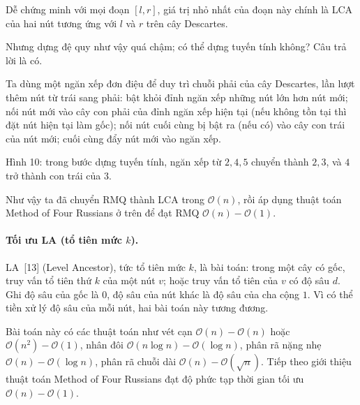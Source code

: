 \documentclass[11pt]{article}
\newcommand{\Oh}{\mathcal{O}}
\begin{document}
Dễ chứng minh với mọi đoạn \([l,r]\), giá trị nhỏ nhất của đoạn này chính là
LCA của hai nút tương ứng với \(l\) và \(r\) trên cây Descartes.

Nhưng dựng đệ quy như vậy quá chậm; có thể dựng tuyến tính không? Câu trả lời
là có.

Ta dùng một ngăn xếp đơn điệu để duy trì chuỗi phải của cây Descartes, lần
lượt thêm nút từ trái sang phải: bật khỏi đỉnh ngăn xếp những nút lớn hơn nút
mới; nối nút mới vào cây con phải của đỉnh ngăn xếp hiện tại (nếu không tồn
tại thì đặt nút hiện tại làm gốc); nối nút cuối cùng bị bật ra (nếu có) vào
cây con trái của nút mới; cuối cùng đẩy nút mới vào ngăn xếp.

\begin{center}

\small Hình 10: trong bước dựng tuyến tính, ngăn xếp từ \(2,4,5\) chuyển thành
\(2,3\), và \(4\) trở thành con trái của \(3\).
\end{center}

Như vậy ta đã chuyển RMQ thành LCA trong \(\Oh(n)\), rồi áp dụng thuật toán
Method of Four Russians ở trên để đạt RMQ \(\Oh(n)-\Oh(1)\).

\paragraph{Tối ưu LA (tổ tiên mức \(k\)).}
LA~[13] (Level Ancestor), tức tổ tiên mức \(k\), là bài toán: trong một cây có
gốc, truy vấn tổ tiên thứ \(k\) của một nút \(v\); hoặc truy vấn tổ tiên của
\(v\) có độ sâu \(d\). Ghi độ sâu của gốc là \(0\), độ sâu của nút khác là độ
sâu của cha cộng \(1\). Vì có thể tiền xử lý độ sâu của mỗi nút, hai bài toán
này tương đương.

Bài toán này có các thuật toán như vét cạn \(\Oh(n)-\Oh(n)\) hoặc
\(\Oh(n^2)-\Oh(1)\), nhân đôi \(\Oh(n\log n)-\Oh(\log n)\), phân rã nặng nhẹ
\(\Oh(n)-\Oh(\log n)\), phân rã chuỗi dài \(\Oh(n)-\Oh(\sqrt n)\). Tiếp theo
giới thiệu thuật toán Method of Four Russians đạt độ phức tạp thời gian tối
ưu \(\Oh(n)-\Oh(1)\).
\end{document}
